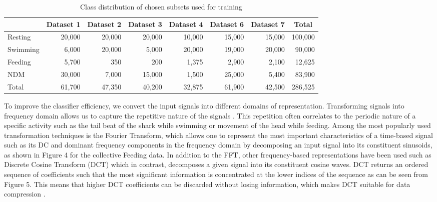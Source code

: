 \documentclass[conference]{IEEEtran}
\begin{document}
\begin{table}[tp!]
	\centering
	\caption{Class distribution of chosen subsets used for training}
	\begin{tabular}{l r r r r r r r}
	\hline
	& \textbf{Dataset 1} & \textbf{Dataset 2} & \textbf{Dataset 3} & \textbf{Dataset 4} & \textbf{Dataset 6} & \textbf{Dataset 7} & \multicolumn{1}{c}{\textbf{Total}}\\
	\hline
	Resting & 20,000 & 20,000 & 20,000 & 10,000 & 15,000 & 15,000 & 100,000 \\
	Swimming & 6,000 & 20,000 & 5,000 & 20,000 & 19,000 & 20,000 & 90,000 \\
	Feeding & 5,700 & 350 & 200 & 1,375 & 2,900 & 2,100 & 12,625 \\
	NDM & 30,000 & 7,000 & 15,000 & 1,500 & 25,000 & 5,400 & 83,900 \\
	Total & 61,700 & 47,350 & 40,200 & 32,875 & 61,900 & 42,500 & 286,525 \\
	\hline
	\end{tabular}                
	\label{}
\end{table}
To improve the classifier efficiency, we convert the input signals into different domains of representation. Transforming signals into frequency domain allows us to capture the repetitive nature of the signals \cite{figo}. This repetition often correlates to the periodic nature of a specific activity such as the tail beat of the shark while swimming or movement of the head while feeding.  Among the most popularly used transformation techniques is the Fourier Transform, which allows one to represent the most important characteristics of a time-based signal such as its  DC and dominant frequency components in the frequency domain by decomposing an input signal into its constituent sinusoids, as shown in Figure 4  for the collective Feeding data. In addition to the FFT, other frequency-based representations have been used such as Discrete Cosine Transform (DCT) which in contrast, decomposes a given signal into its constituent cosine waves. DCT returns an ordered sequence of coefficients such that the most significant information is concentrated at the lower indices of the sequence as can be seen from Figure 5.  This means that higher DCT coefficients can be discarded without losing information, which makes DCT suitable for data compression \cite{sani}.
\end{document}
